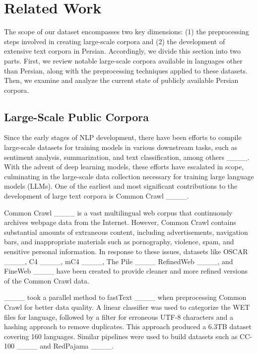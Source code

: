 \section{Related Work}
The scope of our dataset encompasses two key dimensions: (1) the preprocessing steps involved in creating large-scale corpora and (2) the development of extensive text corpora in Persian. Accordingly, we divide this section into two parts. First, we review notable large-scale corpora available in languages other than Persian, along with the preprocessing techniques applied to these datasets. Then, we examine and analyze the current state of publicly available Persian corpora.

\subsection{Large-Scale Public Corpora}
Since the early stages of NLP development, there have been efforts to compile large-scale datasets for training models in various downstream tasks, such as sentiment analysis, summarization, and text classification, among others ____. With the advent of deep learning models, these efforts have escalated in scope, culminating in the large-scale data collection necessary for training large language models (LLMs). One of the earliest and most significant contributions to the development of large text corpora is Common Crawl ____.

Common Crawl ____ is a vast multilingual web corpus that continuously archives webpage data from the Internet. However, Common Crawl contains substantial amounts of extraneous content, including advertisements, navigation bars, and inappropriate materials such as pornography, violence, spam, and sensitive personal information. In response to these issues, datasets like OSCAR ____, C4 ____, mC4 ____, The Pile ____ RefinedWeb ____, and FineWeb ____  have been created to provide cleaner and more refined versions of the Common Crawl data.

____ took a parallel method to fastText ____ when preprocessing Common Crawl for better data quality. A linear classifier was used to categorize the WET files for language, followed by a filter for erroneous UTF-8 characters and a hashing approach to remove duplicates. This approach produced a 6.3TB dataset covering 160 languages. Similar pipelines were used to build datasets such as CC-100 ____ and RedPajama ____.

